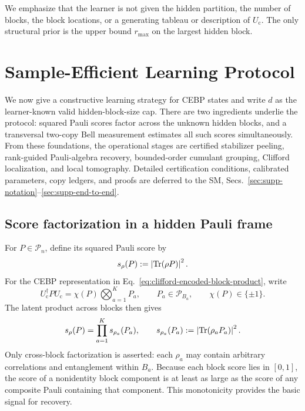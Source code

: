 \documentclass[
  aps,
  prx,
  reprint,
  superscriptaddress,
  amsmath,
  amssymb,
  nofootinbib,
  longbibliography
]{revtex4-2}
\newcommand{\Pc}{\mathcal{P}}
\begin{document}
\noindent We emphasize that the learner is not given the hidden partition, the number of
blocks, the block locations, or a generating tableau or description of
$U_{\mathrm c}$.
The only structural prior is the upper bound $r_{\max}$ on the largest
hidden block.






\section{Sample-Efficient Learning Protocol}

We now give a constructive learning strategy for CEBP states and write
$d$ as the learner-known valid hidden-block-size cap.
There are two ingredients underlie the protocol: squared Pauli scores factor across the
unknown hidden blocks, and a transversal two-copy Bell measurement estimates
all such scores simultaneously.  From these foundations, the operational
stages are certified stabilizer peeling, rank-guided Pauli-algebra recovery,
bounded-order cumulant grouping, Clifford localization, and local tomography.
Detailed certification conditions, calibrated parameters, copy ledgers, and
proofs are deferred to the SM,
Secs.~\ref{sec:supp-notation}--\ref{sec:supp-end-to-end}.

\subsection{Score factorization in a hidden Pauli frame}

For $P\in\Pc_n$, define its squared Pauli score by
\begin{equation}
s_\rho(P):=\left|\Tr(\rho P)\right|^2.
\end{equation}
For the CEBP representation in
Eq.~\eqref{eq:clifford-encoded-block-product}, write
\begin{equation}
U_{\mathrm c}^\dagger P U_{\mathrm c}
=
\chi(P)\bigotimes_{a=1}^K P_a,
\qquad
P_a\in\Pc_{B_a},
\qquad
\chi(P)\in\{\pm1\}.
\end{equation}
The latent product across blocks then gives
\begin{equation}
s_\rho(P)
=
\prod_{a=1}^K s_{\rho_a}(P_a),
\qquad
s_{\rho_a}(P_a):=\left|\Tr(\rho_aP_a)\right|^2.
\label{eq:main-transformed-pauli-factorization-intuition}
\end{equation}
Only cross-block factorization is asserted: each $\rho_a$ may contain
arbitrary correlations and entanglement within $B_a$. Because each block score lies in $[0,1]$, the score of a nonidentity block component is at least as large as the score of any composite Pauli containing that component. This monotonicity provides the basic signal for recovery.
\end{document}
